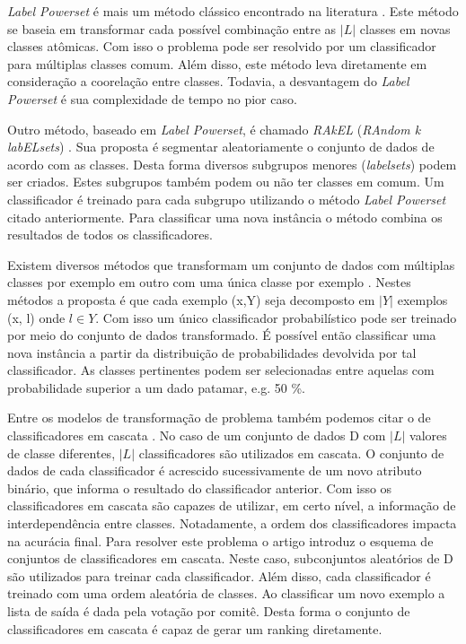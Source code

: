 \textit{Label Powerset} é mais um método clássico encontrado na literatura \cite{Tsoumakas02, Read02}.
Este método se baseia em transformar cada possível combinação entre as $\vert L \vert$ classes em novas classes atômicas.
Com isso o problema pode ser resolvido por um classificador para múltiplas classes comum.
Além disso, este método leva diretamente em consideração a coorelação entre classes.
Todavia, a desvantagem do \textit{Label Powerset} é sua complexidade de tempo no pior caso.

Outro método, baseado em \textit{Label Powerset}, é chamado \textit{RAkEL} (\textit{RAndom k labELsets}) \cite{Tsoumakas03}.
Sua proposta é segmentar aleatoriamente o conjunto de dados de acordo com as classes.
Desta forma diversos subgrupos menores (\textit{labelsets}) podem ser criados.
Estes subgrupos também podem ou não ter classes em comum.
Um classificador é treinado para cada subgrupo utilizando o método \textit{Label Powerset} citado anteriormente.
Para classificar uma nova instância o método combina os resultados de todos os classificadores.

Existem diversos métodos que transformam um conjunto de dados com múltiplas classes por exemplo em outro com uma única classe por exemplo \cite{Boutell, Chen}.
Nestes métodos a proposta é que cada exemplo (x,Y) seja decomposto em $\vert Y \vert$ exemplos (x, l) onde $l \in Y$.
Com isso um único classificador probabilístico pode ser treinado por meio do conjunto de dados transformado.
É possível então classificar uma nova instância a partir da distribuição de probabilidades devolvida por tal classificador.
As classes pertinentes podem ser selecionadas entre aquelas com probabilidade superior a um dado patamar, e.g. 50 \%.

Entre os modelos de transformação de problema também podemos citar o de classificadores em cascata \cite{Read}. 
No caso de um conjunto de dados D com $\vert L \vert$ valores de classe diferentes, $\vert L \vert$ classificadores são utilizados em cascata. 
O conjunto de dados de cada classificador é acrescido sucessivamente de um novo atributo binário, que informa o resultado do classificador anterior. 
Com isso os classificadores em cascata são capazes de utilizar, em certo nível, a informação de interdependência entre classes. 
Notadamente, a ordem dos classificadores impacta na acurácia final.
Para resolver este problema o artigo introduz o esquema de conjuntos de classificadores em cascata. 
Neste caso, subconjuntos aleatórios de D são utilizados para treinar cada classificador. 
Além disso, cada classificador é treinado com uma ordem aleatória de classes. 
Ao classificar um novo exemplo a lista de saída é dada pela votação por comitê. 
Desta forma o conjunto de classificadores em cascata é capaz de gerar um ranking diretamente.

